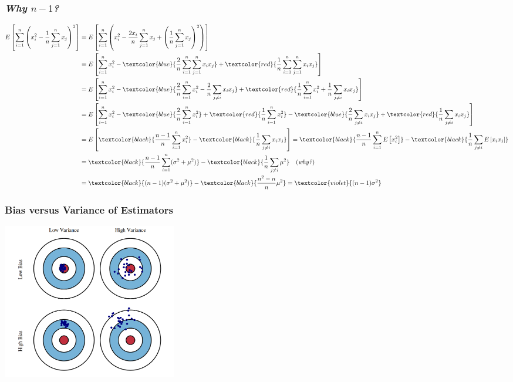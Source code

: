 \documentclass[xcolor={dvipsnames}]{beamer}
\begin{document}
\frame
{
 \frametitle{\emph{Why $n-1$?}}

\tiny 
\begin{align*} 
E\left[\sum_{i=1}^n\left(x_i^2-\frac{1}{n}\sum_{j=1}^nx_j\right)^2\right] 
= {}& E\left[\sum_{i=1}^n\left(x_i^2-\frac{2x_i}{n}\sum_{j=1}^nx_j + 
\left(\frac{1}{n}\sum_{j=1}^nx_j\right)^2\right)\right] \\ 
= {}& E\left[\sum_{i=1}^nx_i^2-\textcolor{blue}{\frac{2}{n} \sum_{i=1}^n \sum_{j=1}^nx_ix_j} + 
\textcolor{red}{\frac{1}{n} \sum_{i=1}^n\sum_{j=1}^nx_ix_j}\right] \\ 
= {}& E\left[\sum_{i=1}^nx_i^2 - \textcolor{blue}{\frac{2}{n}\sum_{i=1}^nx_i^2 -\frac{2}{n}\sum_{j\not=i}x_ix_j} + 
\textcolor{red}{\frac{1}{n}\sum_{i=1}^nx_i^2 + \frac{1}{n}\sum_{j\not=i}x_ix_j} \right] \\
= {}& E\left[\sum_{i=1}^nx_i^2 - \textcolor{blue}{\frac{2}{n}\sum_{i=1}^nx_i^2} + \textcolor{red}{\frac{1}{n}\sum_{i=1}^nx_i^2} 
 -\textcolor{blue}{\frac{2}{n}\sum_{j\not=i}x_ix_j}  
 + \textcolor{red}{\frac{1}{n}\sum_{j\not=i}x_ix_j} \right] \\
 = {}& E\left[\textcolor{black}{\frac{n-1}{n}\sum_{i=1}^nx_i^2} 
 -\textcolor{black}{\frac{1}{n}\sum_{j\not=i}x_ix_j}  \right] = \textcolor{black}{\frac{n-1}{n}\sum_{i=1}^n E\left[x_i^2\right] } 
 -\textcolor{black}{\frac{1}{n} \sum_{j\not=i} E\left[x_ix_j\right] }   \\ 
 = {}& \textcolor{black}{\frac{n-1}{n}\sum_{i=1}^n (\sigma^2 + \mu^2) } 
 -\textcolor{black}{\frac{1}{n} \sum_{j\not=i} \mu^2 } \quad (\text{\emph{why?}})  \\ 
 = {}& \textcolor{black}{(n-1) (\sigma^2 + \mu^2) } 
 -\textcolor{black}{\frac{n^2-n}{n} \mu^2 }   =  \textcolor{violet}{(n-1)\sigma^2}
\end{align*}

}

\frame
{
 \frametitle{Bias versus Variance of Estimators}

\hspace{3em}\includegraphics[width=3in]{stuff/bullseye.png}
}
\end{document}
